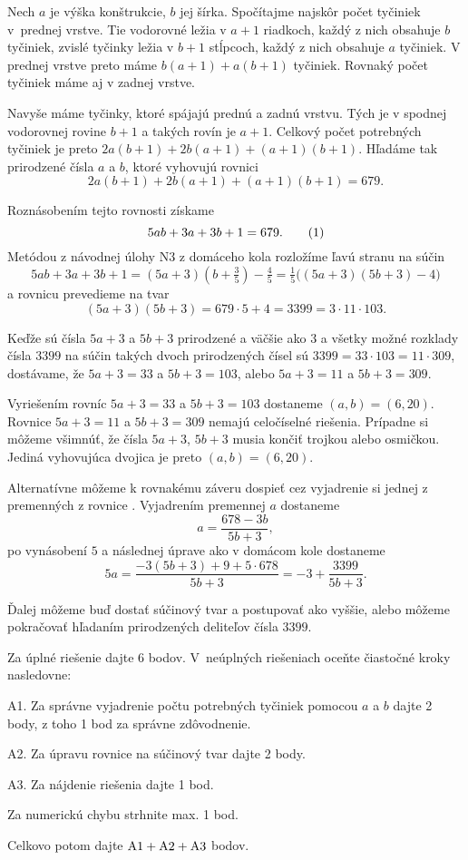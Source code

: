 {%
Nech $a$ je výška konštrukcie, $b$ jej šírka.
Spočítajme najskôr počet tyčiniek v~prednej vrstve. Tie vodorovné ležia v $a+1$ riadkoch, každý z nich obsahuje $b$ tyčiniek,
zvislé tyčinky ležia v $b+1$ stĺpcoch, každý z nich obsahuje $a$ tyčiniek.
V prednej vrstve preto máme $b(a+1) + a(b+1) $ tyčiniek. Rovnaký počet tyčiniek máme aj v zadnej vrstve.

Navyše máme tyčinky, ktoré spájajú prednú a zadnú vrstvu.
Tých je v spodnej vodorovnej rovine $b+1$ a takých rovín je $a+1$.
Celkový počet potrebných tyčiniek je preto $2a(b+1)+2b(a+1) +(a+1)(b+1)$.
Hľadáme tak prirodzené čísla $a$ a $b$, ktoré vyhovujú rovnici $$2a(b+1)+2b(a+1) +(a+1)(b+1) = 679.$$

Roznásobením tejto rovnosti získame
$$
5ab+3a+3b+1=679.
\tag1
$$
Metódou z návodnej úlohy N3 z domáceho kola rozložíme ľavú stranu na súčin
$$
5ab+3a+3b+1=(5a+3)(b+\tfrac35)-\tfrac45=\tfrac15\bigl((5a+3)(5b+3)-4\bigr)
$$
a rovnicu prevedieme na tvar
$$
(5a+3)(5b+3)=679\cdot 5 + 4 = 3399=3\cdot 11\cdot 103.
$$

Keďže sú čísla $5a+3$ a $5b+3$ prirodzené a väčšie ako $3$ a všetky možné rozklady čísla $3399$ na súčin takých dvoch prirodzených čísel sú $3399=33\cdot 103 = 11 \cdot 309$, dostávame, že $5a+3 =33$ a $5b+3 =103$,
alebo $5a+3 =11 $ a $5b+3 =309$.

Vyriešením rovníc $5a+3 =33 $ a $5b+3 =103$ dostaneme $(a,b)=(6,20)$.
Rovnice $5a+3 =11 $ a $5b+3 =309$
nemajú celočíselné riešenia.
Prípadne si môžeme všimnúť, že čísla $5a+3$, $5b+3$ musia končiť trojkou alebo osmičkou. Jediná vyhovujúca dvojica je preto $(a,b)=(6,20)$.

\poznamka
Alternatívne môžeme k rovnakému záveru dospieť cez vyjadrenie si jednej z premenných z rovnice . Vyjadrením premennej $a$ dostaneme
$$ a= \frac{678 -3b}{5b+3},$$
po vynásobení $5$ a následnej úprave ako v domácom kole dostaneme
$$5 a= \frac{ -3 (5b +3)+ 9 +5 \cdot 678} {5b+3}= -3 + \frac{3399}{5b+3}.$$

Ďalej môžeme buď dostať súčinový tvar  a postupovať ako vyššie, alebo môžeme pokračovať hľadaním prirodzených deliteľov čísla $3399$.

\schemaABC
Za úplné riešenie dajte 6 bodov. V~neúplných riešeniach oceňte čiastočné kroky nasledovne:

\smallskip
\item{A1.} Za správne vyjadrenie počtu potrebných tyčiniek pomocou $a$ a $b$ dajte 2 body, z toho 1 bod za správne zdôvodnenie.
\item{A2.} Za úpravu rovnice na súčinový tvar dajte 2 body.
\item{A3.} Za nájdenie riešenia dajte 1 bod.

\smallskip\noindent
Za numerickú chybu strhnite max. 1 bod.

Celkovo potom dajte $\rm A1+A2+A3$ bodov.
\endschema
}

